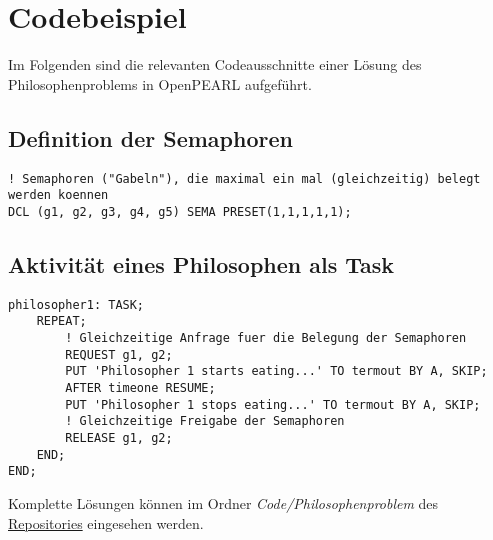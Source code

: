 \section{Codebeispiel}
	Im Folgenden sind die relevanten Codeausschnitte einer Lösung des Philosophenproblems in OpenPEARL aufgeführt.
	
\subsection{Definition der Semaphoren}
	\begin{lstlisting}
! Semaphoren ("Gabeln"), die maximal ein mal (gleichzeitig) belegt werden koennen
DCL (g1, g2, g3, g4, g5) SEMA PRESET(1,1,1,1,1);
	\end{lstlisting}
	
\subsection{Aktivität eines Philosophen als Task}
	\begin{lstlisting}
philosopher1: TASK;
	REPEAT;
		! Gleichzeitige Anfrage fuer die Belegung der Semaphoren
		REQUEST g1, g2;
		PUT 'Philosopher 1 starts eating...' TO termout BY A, SKIP;
		AFTER timeone RESUME;
		PUT 'Philosopher 1 stops eating...' TO termout BY A, SKIP;
		! Gleichzeitige Freigabe der Semaphoren
		RELEASE g1, g2;
	END;
END;
	\end{lstlisting}
	
	Komplette Lösungen können im Ordner \emph{Code/Philosophenproblem} des \href{https://github.com/OpenPearl-HFUWPV1718/SensorCar}{Repositories} eingesehen werden.\\